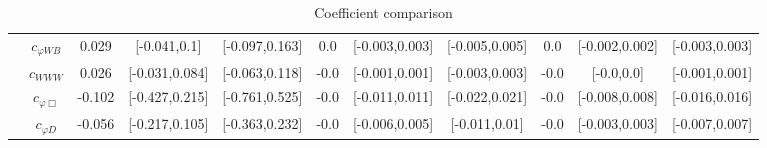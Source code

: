 \documentclass{article}
\begin{document}
\begin{table}[H]
\begin{tabular}{|c|c|c|c|c|c|c|c|c|c|c|}
 & $c_{\varphi WB}$ & 0.029                             & [-0.041,0.1]                                 & [-0.097,0.163] & 0.0                             & [-0.003,0.003]                                 & [-0.005,0.005] & 0.0                             & [-0.002,0.002]                                 & [-0.003,0.003] \\ \cline{2-11}
 & $c_{WWW}$ & 0.026                             & [-0.031,0.084]                                 & [-0.063,0.118] & -0.0                             & [-0.001,0.001]                                 & [-0.003,0.003] & -0.0                             & [-0.0,0.0]                                 & [-0.001,0.001] \\ \cline{2-11}
 & $c_{\varphi \Box}$ & -0.102                             & [-0.427,0.215]                                 & [-0.761,0.525] & -0.0                             & [-0.011,0.011]                                 & [-0.022,0.021] & -0.0                             & [-0.008,0.008]                                 & [-0.016,0.016] \\ \cline{2-11}
 & $c_{\varphi D}$ & -0.056                             & [-0.217,0.105]                                 & [-0.363,0.232] & -0.0                             & [-0.006,0.005]                                 & [-0.011,0.01] & -0.0                             & [-0.003,0.003]                                 & [-0.007,0.007] \\ \cline{2-11}
\hline
\end{tabular}
\caption{Coefficient comparison}
\end{table}
\end{document}
